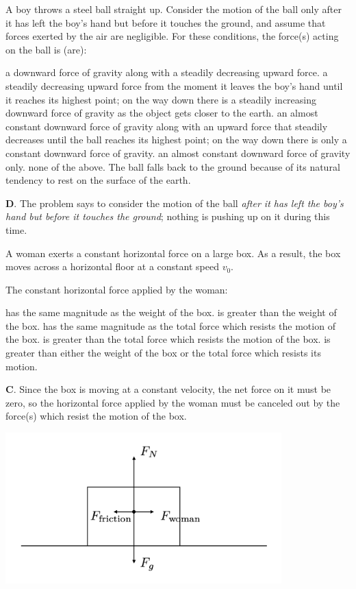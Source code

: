 \documentclass[12pt]{exam}
\begin{document}
\begin{questions}
\question
A boy throws a steel ball straight up. Consider the motion of the ball only after it has left the boy's hand but before it touches the ground, and assume that forces exerted by the air are negligible. For these conditions, the force(s) acting on the ball is (are):
\begin{choices}
\choice a downward force of gravity along with a steadily decreasing upward force.
\choice a steadily decreasing upward force from the moment it leaves the boy's hand until it reaches its highest point; on the way down there is a steadily increasing downward force of gravity as the object gets closer to the earth.
\choice an almost constant downward force of gravity along with an upward force that steadily decreases until the ball reaches its highest point; on the way down there is only a constant downward force of gravity.
\choice an almost constant downward force of gravity only.
\choice none of the above. The ball falls back to the ground because of its natural tendency to rest on the surface of the earth.
\end{choices}
\begin{TheSolution}
\textbf{D}. The problem says to consider the motion of the ball \textit{after it has left the boy's hand but before it touches the ground}; nothing is pushing up on it during this time.
\end{TheSolution}
\question
\label{ques:25}
A woman exerts a constant horizontal force on a large box. As a result, the box moves across a horizontal floor at a constant speed $v_0$.

The constant horizontal force applied by the woman:
\begin{choices}
\choice has the same magnitude as the weight of the box.
\choice is greater than the weight of the box.
\choice has the same magnitude as the total force which resists the motion of the box.
\choice is greater than the total force which resists the motion of the box.
\choice is greater than either the weight of the box or the total force which resists its motion.
\end{choices}
\begin{TheSolution}
\textbf{C}. Since the box is moving at a constant velocity, the net force on it must be zero, so the horizontal force applied by the woman must be canceled out by the force(s) which resist the motion of the box.

\begin{center}
\includegraphics[width=0.8\textwidth]{../images/test1_box1.png}
\end{center}
\end{TheSolution}


\end{questions}
\end{document}
